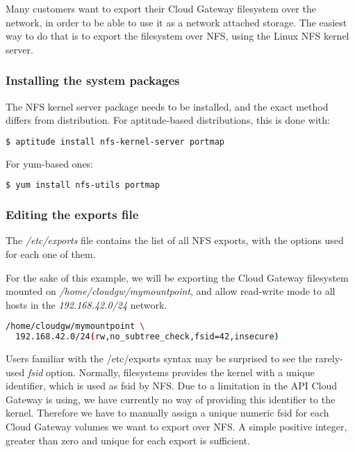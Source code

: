 \documentclass[11pt,fleqn,openany]{book} %
\begin{document}
Many customers want to export their Cloud Gateway filesystem over the network, in order to be able to use it as a network attached storage.
The easiest way to do that is to export the filesystem over NFS, using the Linux NFS kernel server.

\subsubsection*{Installing the system packages}

The NFS kernel server package needs to be installed, and the exact method differs from distribution.
For aptitude-based distributions, this is done with:

\begin{lstlisting}[language=bash]
$ aptitude install nfs-kernel-server portmap
\end{lstlisting}

For yum-based ones:

\begin{lstlisting}[language=bash]
$ yum install nfs-utils portmap
\end{lstlisting}

\subsubsection*{Editing the exports file}

The \textit{/etc/exports} file contains the list of all NFS exports, with the options used for each one of them.

For the sake of this example, we will be exporting the Cloud Gateway filesystem mounted on \textit{/home/cloudgw/mymountpoint},
and allow read-write mode to all hosts in the \textit{192.168.42.0/24} network.

\begin{lstlisting}[language=bash]
/home/cloudgw/mymountpoint \
  192.168.42.0/24(rw,no_subtree_check,fsid=42,insecure)
\end{lstlisting}

Users familiar with the /etc/exports syntax may be surprised to see the rarely-used \textit{fsid} option. Normally, filesystems
provides the kernel with a unique identifier, which is used as fsid by NFS. Due to a limitation in the API Cloud Gateway is using,
we have currently no way of providing this identifier to the kernel. Therefore we have to manually assign a unique numeric fsid
for each Cloud Gateway volumes we want to export over NFS. A simple positive integer, greater than zero and unique for each export
is sufficient.
\end{document}
